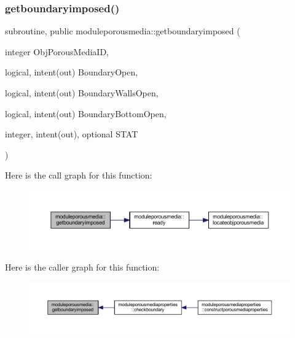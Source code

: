 \subsubsection{\texorpdfstring{getboundaryimposed()}{getboundaryimposed()}}
{\footnotesize\ttfamily subroutine, public moduleporousmedia\+::getboundaryimposed (\begin{DoxyParamCaption}\item[{integer}]{Obj\+Porous\+Media\+ID,  }\item[{logical, intent(out)}]{Boundary\+Open,  }\item[{logical, intent(out)}]{Boundary\+Walls\+Open,  }\item[{logical, intent(out)}]{Boundary\+Bottom\+Open,  }\item[{integer, intent(out), optional}]{S\+T\+AT }\end{DoxyParamCaption})}

Here is the call graph for this function\+:\nopagebreak
\begin{figure}[H]
\begin{center}
\leavevmode
\includegraphics[width=350pt]{namespacemoduleporousmedia_a7ef0de747f82c7f61108e9f6033b260d_cgraph}
\end{center}
\end{figure}
Here is the caller graph for this function\+:\nopagebreak
\begin{figure}[H]
\begin{center}
\leavevmode
\includegraphics[width=350pt]{namespacemoduleporousmedia_a7ef0de747f82c7f61108e9f6033b260d_icgraph}
\end{center}
\end{figure}
\mbox{\label{namespacemoduleporousmedia_ae3c2ce61a7783cf1653e19109914fe29}} 
